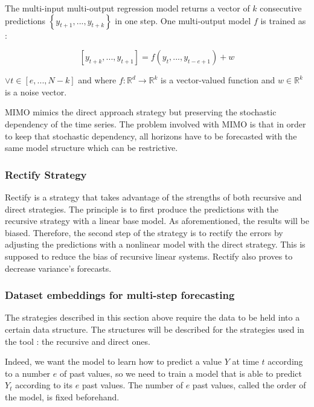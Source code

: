 \documentclass[11pt,a4paper,oneside]{book}
\begin{document}
The multi-input multi-output regression model returns a vector of $k$ consecutive predictions $\left\{y_{t+1},..., y_{t+k}\right\}$ in one step. One multi-output model $f$ is trained as :

\begin{equation}
    \left[y_{t + k},..., y_{t + 1}\right] = f(y_t,...,y_{t − e + 1}) + w
\end{equation}

$\vee t \in \left[e,..., N - k\right]$ and where $f : \mathbb{R}^d \rightarrow \mathbb{R}^k$ is a vector-valued function and $w \in \mathbb{R}^k$ is a noise vector. \cite{souahib2}

MIMO mimics the direct approach strategy but preserving the stochastic dependency of the time series. The problem involved with MIMO is that in order to keep that stochastic dependency, all horizons have to be forecasted with the same model structure which can be restrictive. \cite{Bonte}\cite{taiebonte}
    
    
\subsubsection{Rectify Strategy}

Rectify is a strategy that takes advantage of the strengths of both recursive and direct strategies. The principle is to first produce the predictions with the recursive strategy with a linear base model. As aforementioned, the results will be biased. Therefore, the second step of the strategy is to rectify the errors by adjusting the predictions with a nonlinear model with the direct strategy. This is supposed to reduce the bias of recursive linear systems. Rectify also proves to decrease variance's forecasts. \cite{BenTaieb}




\subsubsection{Dataset embeddings for multi-step forecasting}\label{embeddings}

The strategies described in this section above require the data to be held into a certain data structure. The structures will be described for the strategies used in the tool : the recursive and direct ones. 

Indeed, we want the model to learn how to predict a value $Y$ at time $t$ according to a number $e$ of past values, so we need to train a model that is able to predict $Y_t$ according to its $e$ past values. The number of $e$ past values, called the order of the model, is fixed beforehand.  
\end{document}
